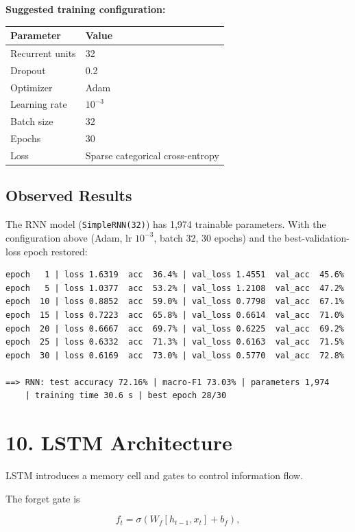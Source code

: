 \documentclass[10pt]{article}
\begin{document}
\textbf{Suggested training configuration:}

\begin{center}
\begin{tabular}{|l|l|}
\hline
Parameter & Value\\
\hline
Recurrent units & 32\\
Dropout & 0.2\\
Optimizer & Adam\\
Learning rate & $10^{-3}$\\
Batch size & 32\\
Epochs & 30\\
Loss & Sparse categorical cross-entropy\\
\hline
\end{tabular}
\end{center}

\subsection*{Observed Results}

The RNN model (\texttt{SimpleRNN(32)}) has 1{,}974 trainable parameters. With
the configuration above (Adam, lr $10^{-3}$, batch 32, 30 epochs) and the
best-validation-loss epoch restored:

\begin{verbatim}
epoch   1 | loss 1.6319  acc  36.4% | val_loss 1.4551  val_acc  45.6%
epoch   5 | loss 1.0377  acc  53.2% | val_loss 1.2108  val_acc  47.2%
epoch  10 | loss 0.8852  acc  59.0% | val_loss 0.7798  val_acc  67.1%
epoch  15 | loss 0.7223  acc  65.8% | val_loss 0.6614  val_acc  71.0%
epoch  20 | loss 0.6667  acc  69.7% | val_loss 0.6225  val_acc  69.2%
epoch  25 | loss 0.6332  acc  71.3% | val_loss 0.6163  val_acc  71.5%
epoch  30 | loss 0.6169  acc  73.0% | val_loss 0.5770  val_acc  72.8%

==> RNN: test accuracy 72.16% | macro-F1 73.03% | parameters 1,974
    | training time 30.6 s | best epoch 28/30
\end{verbatim}

\section*{10. LSTM Architecture}

LSTM introduces a memory cell and gates to control information flow.

The forget gate is

\[
f_t=\sigma(W_f[h_{t-1},x_t]+b_f),
\]
\end{document}
